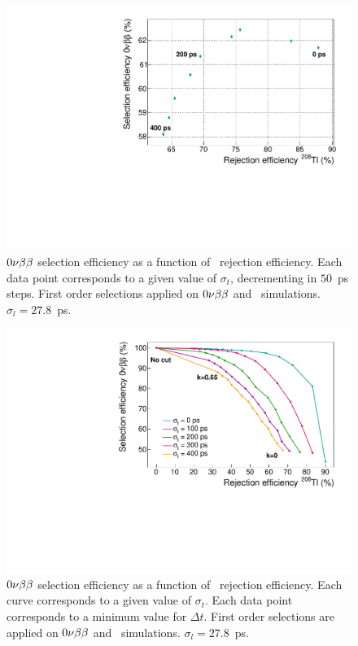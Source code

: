 \begin{figure}[!h]
  \centering
  \includegraphics[width=13cm]{timedifference/fig_timediff/efficiency_proba.pdf}
  \caption{$0\nu\beta\beta$ selection efficiency as a function of \Tl\ rejection efficiency.
    Each data point corresponds to a given value of $\sigma_{t}$, decrementing in $50$~ps steps.
    First order selections applied on $0\nu\beta\beta$ and \Tl\ simulations.
    $\sigma_{l}=27.8$~ps.
    \label{fig:eff_proba_sigma}}
\end{figure}

\begin{figure}[!h]
  \centering
  \includegraphics[width=13cm]{timedifference/fig_timediff/compare_sigma_cut_delta_t.pdf}
  \caption{$0\nu\beta\beta$ selection efficiency as a function of \Tl\ rejection efficiency.
    Each curve corresponds to a given value of $\sigma_{t}$.
    Each data point corresponds to a minimum value for $\Delta t$.
    First order selections are applied on $0\nu\beta\beta$ and \Tl\ simulations.
    $\sigma_{l}=27.8$~ps.
    \label{fig:eff_cut_delta_t_sigma}}
\end{figure}



